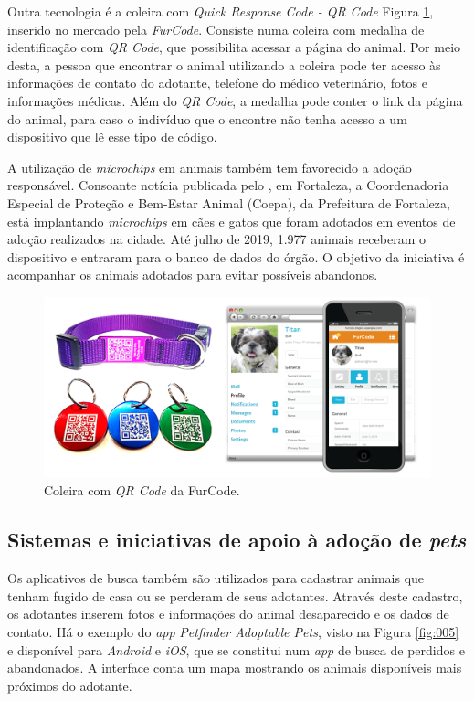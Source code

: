 \documentclass[portuguese]{textolivre}
\begin{document}
Outra tecnologia é a coleira com \textit{Quick Response Code - QR Code} Figura \ref{fig:004}, inserido no mercado pela \textit{FurCode}. Consiste numa coleira com medalha de identificação com \textit{QR Code}, que possibilita acessar a página do animal. Por meio desta, a pessoa que encontrar o animal utilizando a coleira pode ter acesso às informações de contato do adotante, telefone do médico veterinário, fotos e informações médicas. Além do \textit{QR Code}, a medalha pode conter o link da página do animal, para caso o indivíduo que o encontre não tenha acesso a um dispositivo que lê esse tipo de código.

A utilização de \textit{microchips} em animais também tem favorecido a adoção responsável. Consoante notícia publicada pelo \textcite{G1CE:2019}, em Fortaleza, a Coordenadoria Especial de Proteção e Bem-Estar Animal (Coepa), da Prefeitura de Fortaleza, está implantando \textit{microchips} em cães e gatos que foram adotados em eventos de adoção realizados na cidade. Até julho de 2019, 1.977 animais receberam o dispositivo e entraram para o banco de dados do órgão. O objetivo da iniciativa é acompanhar os animais adotados para evitar possíveis abandonos.

\begin{figure}
	\centering
	\includegraphics[scale=0.80]{imagens/fig-004.png}
	\caption{Coleira com \textit{QR Code} da FurCode.}
	\label{fig:004}
\end{figure} 

\subsection{Sistemas e iniciativas de apoio à adoção de \textit{pets}}

Os aplicativos de busca também são utilizados para cadastrar animais que tenham fugido de casa ou se perderam de seus adotantes. Através deste cadastro, os adotantes inserem fotos e informações do animal desaparecido e os dados de contato. Há o exemplo do \textit{app} \textit{Petfinder Adoptable Pets}, visto na Figura \ref{fig:005} e disponível para \textit{Android} e \textit{iOS}, que se constitui num \textit{app} de busca de  perdidos e abandonados. A interface conta um mapa mostrando os animais disponíveis mais próximos do adotante.
\end{document}
